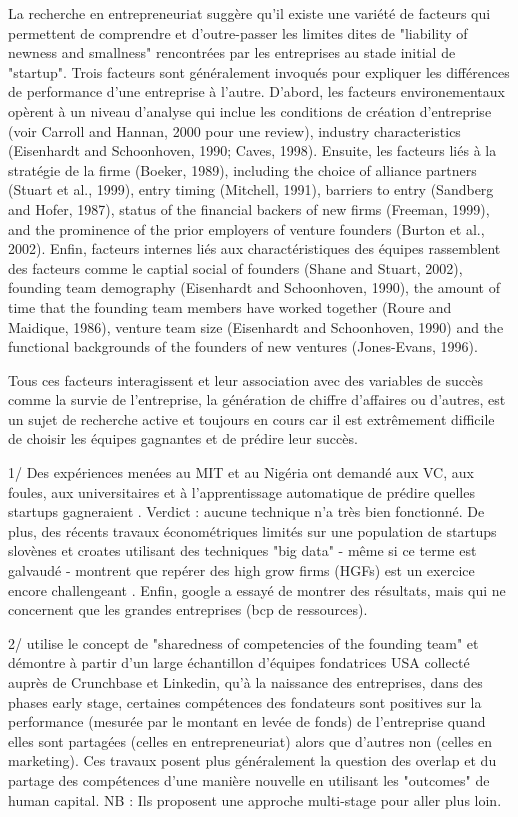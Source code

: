 \documentclass[11pt]{article}
\begin{document}
La recherche en entrepreneuriat suggère qu'il existe une variété de facteurs qui permettent de comprendre et d'outre-passer les limites dites de "liability of newness and smallness" rencontrées par les entreprises au stade initial de "startup". Trois facteurs sont généralement invoqués pour expliquer les différences de performance d'une entreprise à l'autre. D'abord, les facteurs environementaux opèrent à un niveau d'analyse qui inclue les conditions de création d'entreprise (voir Carroll and Hannan, 2000 pour une review), industry characteristics (Eisenhardt and Schoonhoven, 1990; Caves, 1998). Ensuite, les facteurs liés à la stratégie de la firme (Boeker, 1989), including the choice of alliance partners (Stuart et al., 1999), entry timing (Mitchell, 1991), barriers to entry (Sandberg and Hofer, 1987), status of the financial backers of new firms (Freeman, 1999), and the prominence of the prior employers of venture founders (Burton et al., 2002). Enfin, facteurs internes liés aux charactéristiques des équipes rassemblent des facteurs comme le captial social of founders (Shane and Stuart, 2002), founding team demography (Eisenhardt and Schoonhoven, 1990), the amount of time that the founding team members have worked together (Roure and Maidique, 1986), venture team size (Eisenhardt and Schoonhoven, 1990) and the functional backgrounds of the founders of new ventures (Jones-Evans, 1996).

Tous ces facteurs interagissent et leur association avec des variables de succès comme la survie de l'entreprise, la génération de chiffre d'affaires ou d'autres, est un sujet de recherche active et toujours en cours car il est extrêmement difficile de choisir les équipes gagnantes et de prédire leur succès.

1/ Des expériences menées au MIT et au Nigéria ont demandé aux VC, aux foules, aux universitaires et à l'apprentissage automatique de prédire quelles startups gagneraient \citep{ghassemiautomated}. Verdict : aucune technique n'a très bien fonctionné. De plus, des récents travaux économétriques limités sur une population de startups slovènes et croates utilisant des techniques "big data" - même si ce terme est galvaudé - montrent que repérer des high grow firms (HGFs) est un exercice encore challengeant \citep{coad2020catching}. Enfin, google a essayé de montrer des résultats, mais qui ne concernent que les grandes entreprises (bcp de ressources).

2/ \citet{reese2020should} utilise le concept de "sharedness of competencies of the founding team" et démontre à partir d'un large échantillon d'équipes fondatrices USA collecté auprès de Crunchbase et Linkedin, qu'à la naissance des entreprises, dans des phases early stage, certaines compétences des fondateurs sont positives sur la performance (mesurée par le montant en levée de fonds) de l’entreprise quand elles sont partagées (celles en entrepreneuriat) alors que d’autres non (celles en marketing). Ces travaux posent plus généralement la question des overlap et du partage des compétences d'une manière nouvelle en utilisant les "outcomes" de human capital. NB : Ils proposent une approche multi-stage pour aller plus loin.
\end{document}
